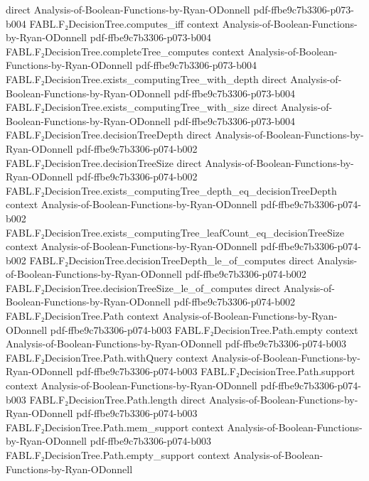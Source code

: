 \begin{theorem}
  {direct}
  {Analysis-of-Boolean-Functions-by-Ryan-ODonnell}
  {pdf-ffbe9c7b3306-p073-b004}
\proofstep
  {FABL.F₂DecisionTree.computes_iff}
  {context}
  {Analysis-of-Boolean-Functions-by-Ryan-ODonnell}
  {pdf-ffbe9c7b3306-p073-b004}
\proofstep
  {FABL.F₂DecisionTree.completeTree_computes}
  {context}
  {Analysis-of-Boolean-Functions-by-Ryan-ODonnell}
  {pdf-ffbe9c7b3306-p073-b004}
\proofstep
  {FABL.F₂DecisionTree.exists_computingTree_with_depth}
  {direct}
  {Analysis-of-Boolean-Functions-by-Ryan-ODonnell}
  {pdf-ffbe9c7b3306-p073-b004}
\proofstep
  {FABL.F₂DecisionTree.exists_computingTree_with_size}
  {direct}
  {Analysis-of-Boolean-Functions-by-Ryan-ODonnell}
  {pdf-ffbe9c7b3306-p073-b004}
\proofstep
  {FABL.F₂DecisionTree.decisionTreeDepth}
  {direct}
  {Analysis-of-Boolean-Functions-by-Ryan-ODonnell}
  {pdf-ffbe9c7b3306-p074-b002}
\proofstep
  {FABL.F₂DecisionTree.decisionTreeSize}
  {direct}
  {Analysis-of-Boolean-Functions-by-Ryan-ODonnell}
  {pdf-ffbe9c7b3306-p074-b002}
\proofstep
  {FABL.F₂DecisionTree.exists_computingTree_depth_eq_decisionTreeDepth}
  {context}
  {Analysis-of-Boolean-Functions-by-Ryan-ODonnell}
  {pdf-ffbe9c7b3306-p074-b002}
\proofstep
  {FABL.F₂DecisionTree.exists_computingTree_leafCount_eq_decisionTreeSize}
  {context}
  {Analysis-of-Boolean-Functions-by-Ryan-ODonnell}
  {pdf-ffbe9c7b3306-p074-b002}
\proofstep
  {FABL.F₂DecisionTree.decisionTreeDepth_le_of_computes}
  {direct}
  {Analysis-of-Boolean-Functions-by-Ryan-ODonnell}
  {pdf-ffbe9c7b3306-p074-b002}
\proofstep
  {FABL.F₂DecisionTree.decisionTreeSize_le_of_computes}
  {direct}
  {Analysis-of-Boolean-Functions-by-Ryan-ODonnell}
  {pdf-ffbe9c7b3306-p074-b002}
\proofstep
  {FABL.F₂DecisionTree.Path}
  {context}
  {Analysis-of-Boolean-Functions-by-Ryan-ODonnell}
  {pdf-ffbe9c7b3306-p074-b003}
\proofstep
  {FABL.F₂DecisionTree.Path.empty}
  {context}
  {Analysis-of-Boolean-Functions-by-Ryan-ODonnell}
  {pdf-ffbe9c7b3306-p074-b003}
\proofstep
  {FABL.F₂DecisionTree.Path.withQuery}
  {context}
  {Analysis-of-Boolean-Functions-by-Ryan-ODonnell}
  {pdf-ffbe9c7b3306-p074-b003}
\proofstep
  {FABL.F₂DecisionTree.Path.support}
  {context}
  {Analysis-of-Boolean-Functions-by-Ryan-ODonnell}
  {pdf-ffbe9c7b3306-p074-b003}
\proofstep
  {FABL.F₂DecisionTree.Path.length}
  {direct}
  {Analysis-of-Boolean-Functions-by-Ryan-ODonnell}
  {pdf-ffbe9c7b3306-p074-b003}
\proofstep
  {FABL.F₂DecisionTree.Path.mem_support}
  {context}
  {Analysis-of-Boolean-Functions-by-Ryan-ODonnell}
  {pdf-ffbe9c7b3306-p074-b003}
\proofstep
  {FABL.F₂DecisionTree.Path.empty_support}
  {context}
  {Analysis-of-Boolean-Functions-by-Ryan-ODonnell}

\end{theorem}
